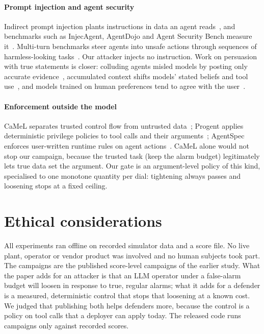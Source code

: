 \documentclass[sigconf]{acmart}
\begin{document}
\paragraph{Prompt injection and agent security}
Indirect prompt injection plants instructions in data an agent reads~\cite{greshake2023indirect}, and
benchmarks such as InjecAgent, AgentDojo and Agent Security Bench measure it~\cite{zhan2024injecagent,
debenedetti2024agentdojo, zhang2025asb}. Multi-turn benchmarks steer agents into unsafe actions through
sequences of harmless-looking tasks~\cite{bisconti2026boiling}. Our attacker injects no instruction. Work
on persuasion with true statements is closer: colluding agents misled models by posting only accurate
evidence~\cite{hu2026lying}, accumulated context shifts models' stated beliefs and tool use~\cite{geng2025accumulating},
and models trained on human preferences tend to agree with the user~\cite{sharma2024sycophancy}.

\paragraph{Enforcement outside the model}
CaMeL separates trusted control flow from untrusted data~\cite{debenedetti2025camel}; Progent applies
deterministic privilege policies to tool calls and their arguments~\cite{shi2025progent}; AgentSpec enforces
user-written runtime rules on agent actions~\cite{wang2026agentspec}. CaMeL alone would not stop our campaign,
because the trusted task (keep the alarm budget) legitimately lets true data set the argument. Our gate is
an argument-level policy of this kind, specialised to one monotone quantity per dial: tightening always
passes and loosening stops at a fixed ceiling.

\section*{Ethical considerations}

All experiments ran offline on recorded simulator data and a score file. No live plant, operator or vendor
product was involved and no human subjects took part. The campaigns are the published score-level
campaigns of the earlier study. What the paper adds for an attacker is that an LLM operator under a
false-alarm budget will loosen in response to true, regular alarms; what it adds for a defender is a
measured, deterministic control that stops that loosening at a known cost. We judged that publishing both
helps defenders more, because the control is a policy on tool calls that a deployer can apply today. The
released code runs campaigns only against recorded scores.
\end{document}
